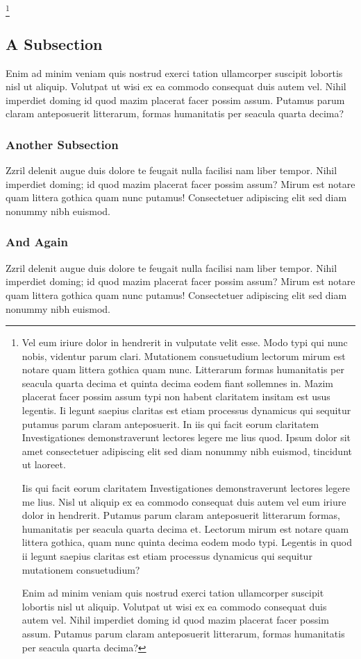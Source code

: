 \footnote{Vel eum iriure dolor in hendrerit in vulputate velit esse. Modo typi qui nunc nobis, videntur parum clari. Mutationem consuetudium lectorum mirum est notare quam littera gothica quam nunc. Litterarum formas humanitatis per seacula quarta decima et quinta decima eodem fiant sollemnes in. Mazim placerat facer possim assum typi non habent claritatem insitam est usus legentis. Ii legunt saepius claritas est etiam processus dynamicus qui sequitur putamus parum claram anteposuerit. In iis qui facit eorum claritatem Investigationes demonstraverunt lectores legere me lius quod. Ipsum dolor sit amet consectetuer adipiscing elit sed diam nonummy nibh euismod, tincidunt ut laoreet.

Iis qui facit eorum claritatem Investigationes demonstraverunt lectores legere me lius. Nisl ut aliquip ex ea commodo consequat duis autem vel eum iriure dolor in hendrerit. Putamus parum claram anteposuerit litterarum formas, humanitatis per seacula quarta decima et. Lectorum mirum est notare quam littera gothica, quam nunc quinta decima eodem modo typi. Legentis in quod ii legunt saepius claritas est etiam processus dynamicus qui sequitur mutationem consuetudium?

Enim ad minim veniam quis nostrud exerci tation ullamcorper suscipit lobortis nisl ut aliquip. Volutpat ut wisi ex ea commodo consequat duis autem vel. Nihil imperdiet doming id quod mazim placerat facer possim assum. Putamus parum claram anteposuerit litterarum, formas humanitatis per seacula quarta decima?}

\subsection{A Subsection}
Enim ad minim veniam quis nostrud exerci tation ullamcorper suscipit lobortis nisl ut aliquip. Volutpat ut wisi ex ea commodo consequat duis autem vel. Nihil imperdiet doming id quod mazim placerat facer possim assum. Putamus parum claram anteposuerit litterarum, formas humanitatis per seacula quarta decima?

\subsubsection{Another Subsection}
Zzril delenit augue duis dolore te feugait nulla facilisi nam liber tempor. Nihil imperdiet doming; id quod mazim placerat facer possim assum? Mirum est notare quam littera gothica quam nunc putamus! Consectetuer adipiscing elit sed diam nonummy nibh euismod.

\subsubsection{And Again}
Zzril delenit augue duis dolore te feugait nulla facilisi nam liber tempor. Nihil imperdiet doming; id quod mazim placerat facer possim assum? Mirum est notare quam littera gothica quam nunc putamus! Consectetuer adipiscing elit sed diam nonummy nibh euismod.
